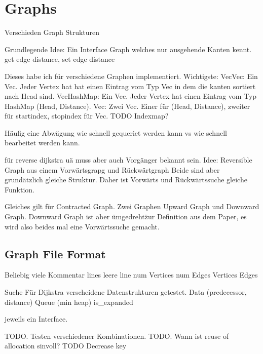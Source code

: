 \chapter{Graphs}

Verschieden Graph Strukturen

Grundlegende Idee:
Ein Interface Graph welches nur ausgehende Kanten kennt.
get edge distance, set edge distance

Dieses habe ich für verschiedene Graphen implementiert.
Wichtigste:
VecVec: Ein Vec. Jeder Vertex hat hat einen Eintrag vom Typ Vec in dem die kanten sortiert nach Head sind.
VecHashMap: Ein Vec. Jeder Vertex hat einen Eintrag vom Typ HashMap (Head, Distance).
Vec: Zwei Vec. Einer für (Head, Distance), zweiter für startindex, stopindex für Vec.
TODO Indexmap?

Häufig eine Abwägung wie schnell gequeriet werden kann vs wie schnell bearbeitet werden kann.


für reverse dijkstra uä muss aber auch Vorgänger bekannt sein.
Idee: Reversible Graph aus einem Vorwärtsgrapg und Rückwärtgraph
Beide sind aber grundätzlich gleiche Struktur. Daher ist Vorwärts und Rückwärtssuche gleiche Funktion.


Gleiches gilt für Contracted Graph. Zwei Graphen Upward Graph und Downward Graph. Downward Graph ist aber \"umgedreht\" zur Definition aus dem Paper, es wird also beides mal eine Vorwärtssuche gemacht.


\section{Graph File Format}
Beliebig viele Kommentar lines
leere line
num Vertices
num Edges
Vertices
Edges

Suche
Für Dijkstra verscheidene Datenstrukturen getestet.
Data (predecessor, distance)
Queue (min heap)
is\_expanded

jeweils ein Interface.

TODO. Testen verschiedener Kombinationen.
TODO. Wann ist reuse of allocation sinvoll?
TODO Decrease key

